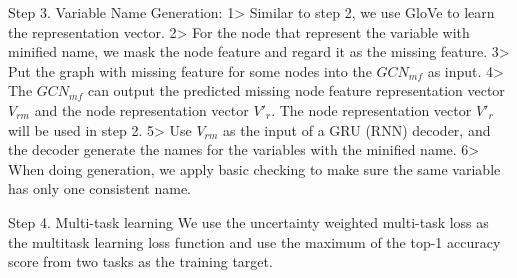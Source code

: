 Step 3. Variable Name Generation:
1> Similar to step 2, we use GloVe to learn the representation vector.
2> For the node that represent the variable with minified name, we mask the node feature and regard it as the missing feature.
3> Put the graph with missing feature for some nodes into the $GCN_{mf}$ as input. 
4> The $GCN_{mf}$ can output the predicted missing node feature representation vector $V_{rm}$ and the node representation vector $V'_r$. The node representation vector $V'_r$ will be used in step 2.
5> Use $V_{rm}$ as the input of a GRU (RNN) decoder, and the decoder generate the names for the variables with the minified name.
6> When doing generation, we apply basic checking to make sure the same variable has only one consistent name.

Step 4. Multi-task learning
We use the uncertainty weighted multi-task loss as the multitask learning loss function and use the maximum of the top-1 accuracy score from two tasks as the training target.
 